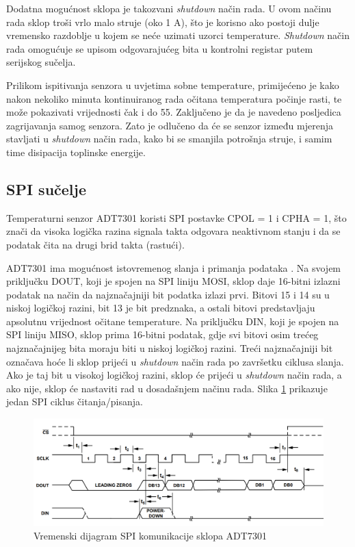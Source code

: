             Dodatna mogućnost sklopa je takozvani \textit{shutdown} način rada. U ovom načinu rada sklop troši vrlo malo struje (oko 1 \textmu{}A), što je korisno ako postoji dulje vremensko razdoblje u kojem se neće uzimati uzorci temperature. \textit{Shutdown} način rada omogućuje se upisom odgovarajućeg bita u kontrolni registar putem serijskog sučelja.
            
            Prilikom ispitivanja senzora u uvjetima sobne temperature, primijećeno je kako nakon nekoliko minuta kontinuiranog rada očitana temperatura počinje rasti, te može pokazivati vrijednosti čak i do 55\textcelsius{}. Zaključeno je da je navedeno posljedica zagrijavanja samog senzora. Zato je odlučeno da će se senzor između mjerenja stavljati u \textit{shutdown} način rada, kako bi se smanjila potrošnja struje, i samim time disipacija toplinske energije.

        \subsection{SPI sučelje}
            Temperaturni senzor ADT7301 koristi SPI postavke CPOL = 1 i CPHA = 1, što znači da visoka logička razina signala takta odgovara neaktivnom stanju i da se podatak čita na drugi brid takta (rastući).
            
            ADT7301 ima mogućnost istovremenog slanja i primanja podataka . Na svojem priključku DOUT, koji je spojen na SPI liniju MOSI, sklop daje 16-bitni izlazni podatak na način da najznačajniji bit podatka izlazi prvi. Bitovi 15 i 14 su u niskoj logičkoj razini, bit 13 je bit predznaka, a ostali bitovi predstavljaju apsolutnu vrijednost očitane temperature. Na priključku DIN, koji je spojen na SPI liniju MISO, sklop prima 16-bitni podatak, gdje svi bitovi osim trećeg najznačajnijeg bita moraju biti u niskoj logičkoj razini. Treći najznačajniji bit označava hoće li sklop prijeći u \textit{shutdown} način rada po završetku ciklusa slanja. Ako je taj bit u visokoj logičkoj razini, sklop će prijeći u \textit{shutdown} način rada, a ako nije, sklop će nastaviti rad u dosadašnjem načinu rada. Slika \ref{fig:adt7301_spi} prikazuje jedan SPI ciklus čitanja/pisanja.
            
            \begin{figure}[htb]
                \centering
                \includegraphics[width=\textwidth]{slike/ADT7301_spi.png}
                \caption{Vremenski dijagram SPI komunikacije sklopa ADT7301 \cite{adt7301_datasheet}}
                \label{fig:adt7301_spi}
            \end{figure}
                